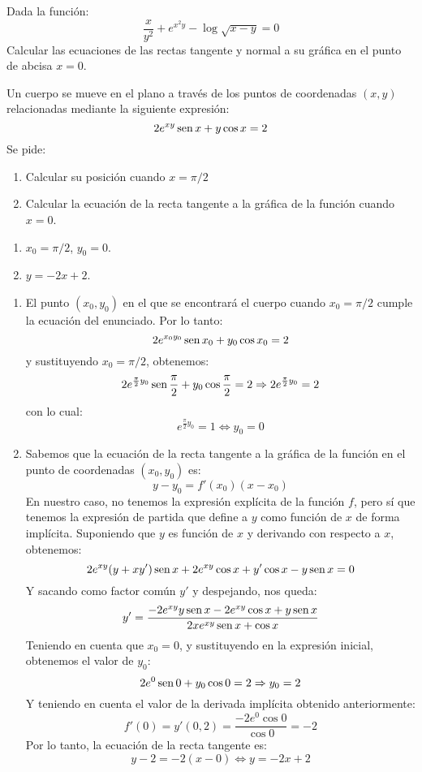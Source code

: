 {Dada la función:
\[
\frac{x}{{y^2 }} + e^{x^2 y}  - \log \sqrt {x - y}  = 0
\]
Calcular las ecuaciones de las rectas tangente y normal a su gráfica en el punto de abcisa $x=0$.
}


{Un cuerpo se mueve en el plano a través de los puntos de coordenadas $(x,y)$ relacionadas mediante la siguiente expresión:
\[
2e^{xy} \operatorname{sen} x + y\cos x = 2
\]
Se pide:
\begin{enumerate}
\item Calcular su posición cuando $x=\pi/2$
\item Calcular la ecuación de la recta tangente a la gráfica de la función cuando $x=0$.
\end{enumerate}
}
{
\begin{enumerate}
\item $x_0=\pi/2$, $y_0 = 0$.
\item $ y=-2x+2$.
\end{enumerate}
}
{\begin{enumerate}
\item El punto $(x_0,y_0)$ en el que se encontrará el cuerpo cuando $x_0=\pi/2$
cumple la ecuación del enunciado. Por lo tanto:
\[
2e^{x_0y_0} \operatorname{sen} x_0 + y_0\cos x_0 = 2
\]
y sustituyendo $x_0=\pi/2$, obtenemos:
\[
2e^{\frac{\pi }{2}y_0 } \operatorname{sen}\frac{\pi }{2} + y_0 \cos \frac{\pi }{2}
= 2 \Rightarrow 2e^{\frac{\pi }{2}y_0 }  = 2
\]
con lo cual:
\[
e^{\frac{\pi }{2}y_0 }  = 1 \Leftrightarrow y_0  = 0
\]

\item Sabemos que la ecuación de la recta tangente a la gráfica de
la función en el punto de coordenadas $(x_0,y_0)$ es:
\[
y-y_0=f'(x_0)(x-x_0)
\]
En nuestro caso, no tenemos la expresión explícita de la función
$f$, pero sí que tenemos la expresión de partida que define a $y$
como función de $x$ de forma implícita. Suponiendo que $y$ es
función de $x$ y derivando con respecto a $x$, obtenemos:
\[
2 e^{xy}(y + xy')\operatorname{sen} x + 2e^{xy}\cos x + y'\cos x - y\operatorname{sen} x = 0
\]
Y sacando como factor común $y'$ y despejando, nos queda:
\[
y' = \frac{{ - 2e^{xy} y \operatorname{sen} x - 2e^{xy} \cos x + y \operatorname{sen}
x}}{{2xe^{xy} \operatorname{sen} x + \cos x}}
\]
Teniendo en cuenta que $x_0=0$, y sustituyendo en la expresión
inicial, obtenemos el valor de $y_0$:
\[
2e^0 \operatorname{sen} 0 + y_0 \cos 0 = 2 \Rightarrow y_0  = 2
\]
Y teniendo en cuenta el valor de la derivada implícita obtenido
anteriormente:
\[
f'(0) = y'(0,2) = \frac{{ - 2e^0 \cos 0}}{{\cos 0}} =  - 2
\]
Por lo tanto, la ecuación de la recta tangente es:
\[
y-2=-2(x-0)\Leftrightarrow y=-2x+2
\]
\end{enumerate}
}


